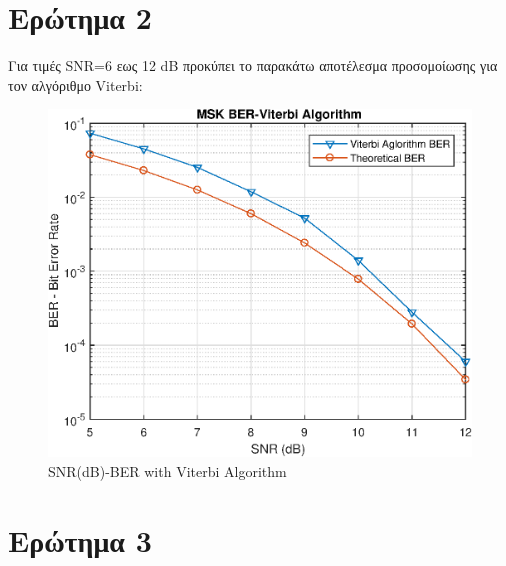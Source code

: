 \documentclass{article}
\begin{document}
\section{Eρώτημα 2}
Για τιμές SNR=6 εως 12 dB προκύπει το παρακάτω αποτέλεσμα προσομοίωσης για τον αλγόριθμο Viterbi:\\
\begin{figure}[h]
	\centering
	\includegraphics[width=0.5\linewidth]{./results/epsFig2}
	\caption{SNR(dB)-BER with Viterbi Algorithm}
\end{figure}
\section{Eρώτημα 3}
\end{document}
